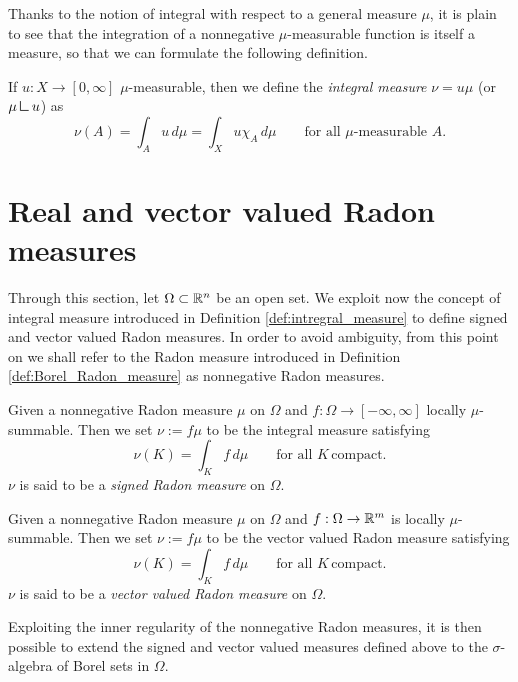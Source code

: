 Thanks to the notion of integral with respect to a general measure $\mu$, it is plain to see that the integration of a nonnegative $\mu$-measurable function is itself a measure, so that we can formulate the following definition.

\begin{definition} \label{def:intregral_measure}
If $u : X \to [0,\infty]$ $\mu$-measurable, then we define the {\em integral measure} $\nu = u \mu$ (or
$\mu \res u$) as 
\[
\nu(A) = \int_A u \, d\mu = \int_X u \chi_A \, d\mu 
\qquad \text{for all } \mu\text{-measurable } A.
\]
\end{definition}

\section{Real and vector valued Radon measures}

Through this section, let $\Omega \subset \mathbb{R}^{n}$ be an open set. We exploit now the concept of integral measure introduced in Definition \ref{def:intregral_measure} to define signed and vector valued Radon measures. In order to avoid ambiguity, from this point on we shall refer to the Radon measure introduced in Definition \ref{def:Borel_Radon_measure} as nonnegative Radon measures.

\begin{definition}\label{def:signed_Radon}
Given a nonnegative Radon measure $\mu$ on $\Omega$ and $f: \Omega \to
[-\infty,\infty]$ locally $\mu$-summable. Then we set $\nu := f \mu$ to be the integral measure satisfying
\[
\nu(K) = \int_K f \, d\mu 
\qquad \text{for all }  K \, \text{compact.}
\]
$\nu$ is said to be a \emph{signed Radon measure} on $\Omega$.
\end{definition}

\begin{definition}\label{def:vector_Radon}
Given a nonnegative Radon measure $\mu$ on $\Omega$ and $f: \Omega \to
\mathbb{R}^m$ is locally $\mu$-summable. Then we set $\nu := f \mu$ to be the vector valued Radon measure satisfying
\[
\nu(K) = \int_K f \, d\mu 
\qquad \text{for all }  K \, \text{compact.}
\]
$\nu$ is said to be a \emph{vector valued Radon measure} on $\Omega$.
\end{definition}

Exploiting the inner regularity of the nonnegative Radon measures, it is then possible to extend the signed and vector valued measures defined above to the $\sigma$-algebra of Borel sets in $\Omega$.

